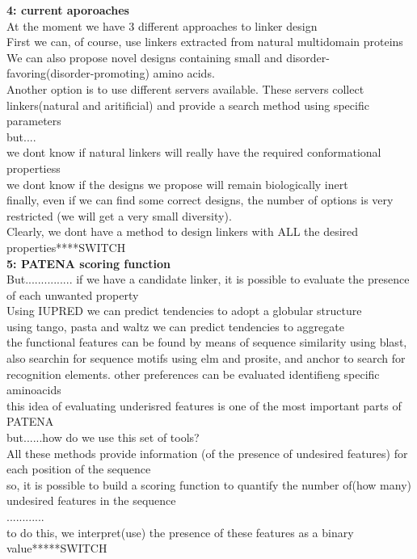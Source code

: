 \documentclass[a4paper,10pt]{article}
\begin{document}
\textbf{4: current aporoaches}\\
At the moment we have 3 different approaches to linker design\\
First we can, of course, use linkers extracted from natural multidomain proteins\\
We can also propose novel designs containing small and disorder-favoring(disorder-promoting) amino acids.\\
Another option is to use different servers available. These servers collect linkers(natural and aritificial) and provide a search method using specific parameters\\

but....\\
we dont know if natural linkers will really have the required conformational propertiess\\
we dont know if the designs we propose will remain biologically inert\\
finally, even if we can find some correct designs, the number of options is very restricted (we will get a very small diversity).\\

Clearly, we dont have a method to design linkers with ALL the desired properties****SWITCH\\


\textbf{5: PATENA scoring function}\\
But............... if we have a candidate linker, it is possible to evaluate the presence of each unwanted property\\

Using IUPRED we can predict tendencies to adopt a globular structure\\
using tango, pasta and waltz we can predict tendencies to aggregate\\
the functional features can be found by means of sequence similarity using blast, also searchin for sequence motifs using elm and prosite, and anchor to search for recognition elements.
other preferences can be evaluated identifieng specific aminoacids\\

this idea of evaluating underisred features is one of the most important parts of PATENA\\
but......how do we use this set of tools?\\
All these methods provide information (of the presence of undesired features) for each position of the sequence\\
so, it is possible to build a scoring function to quantify the number of(how many) undesired features in the sequence\\
............\\
to do this, we interpret(use) the presence of these features as a binary value*****SWITCH\\ 
\end{document}
